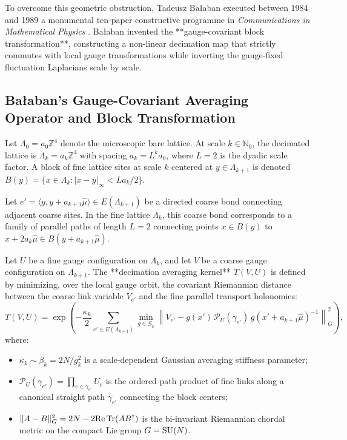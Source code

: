 To overcome this geometric obstruction, Tadeusz Ba\l aban executed between 1984 and 1989 a monumental ten-paper constructive programme in \emph{Communications in Mathematical Physics} \cite{Balaban1984,Balaban1984b,Balaban1985,Balaban1985b,Balaban1987,Balaban1988,Balaban1988b,Balaban1989}. Ba\l aban invented the **gauge-covariant block transformation**, constructing a non-linear decimation map that strictly commutes with local gauge transformations while inverting the gauge-fixed fluctuation Laplacians scale by scale.

\subsection{Ba\l aban's Gauge-Covariant Averaging Operator and Block Transformation}
\label{subsec:balaban_block_transformation}

Let $\Lambda_0 = a_0 \mathbb{Z}^4$ denote the microscopic bare lattice. At scale $k \in \mathbb{N}_0$, the decimated lattice is $\Lambda_k = a_k \mathbb{Z}^4$ with spacing $a_k = L^k a_0$, where $L = 2$ is the dyadic scale factor. A block of fine lattice sites at scale $k$ centered at $y \in \Lambda_{k+1}$ is denoted $B(y) = \{ x \in \Lambda_k : |x - y|_\infty < L a_k / 2 \}$.

Let $e' = \langle y, y + a_{k+1}\hat{\mu} \rangle \in E(\Lambda_{k+1})$ be a directed coarse bond connecting adjacent coarse sites. In the fine lattice $\Lambda_k$, this coarse bond corresponds to a family of parallel paths of length $L = 2$ connecting points $x \in B(y)$ to $x + 2a_k\hat{\mu} \in B(y + a_{k+1}\hat{\mu})$.

\begin{definition}
\label{def:balaban_blocking_transformation}
Let $U$ be a fine gauge configuration on $\Lambda_k$, and let $V$ be a coarse gauge configuration on $\Lambda_{k+1}$. The **decimation averaging kernel** $T(V, U)$ is defined by minimizing, over the local gauge orbit, the covariant Riemannian distance between the coarse link variable $V_{e'}$ and the fine parallel transport holonomies:
\begin{equation}
\label{eq:blocking_kernel}
T(V, U) = \exp\left( -\frac{\kappa_k}{2} \sum_{e' \in E(\Lambda_{k+1})} \min_{g \in \mathcal{G}_k} \left\| V_{e'} - g(x') \, \mathcal{P}_{U}(\gamma_{e'}) \, g(x' + a_{k+1}\hat{\mu})^{-1} \right\|_G^2 \right),
\end{equation}
where:
\begin{itemize}
    \item $\kappa_k \sim \beta_k = 2N/g_k^2$ is a scale-dependent Gaussian averaging stiffness parameter;
    \item $\mathcal{P}_U(\gamma_{e'}) = \prod_{e \in \gamma_{e'}} U_e$ is the ordered path product of fine links along a canonical straight path $\gamma_{e'}$ connecting the block centers;
    \item $\|A - B\|_G^2 = 2N - 2 \mathrm{Re} \, \mathrm{Tr}(A B^\dagger)$ is the bi-invariant Riemannian chordal metric on the compact Lie group $G = \mathrm{SU}(N)$.
\end{itemize}
\end{definition}

